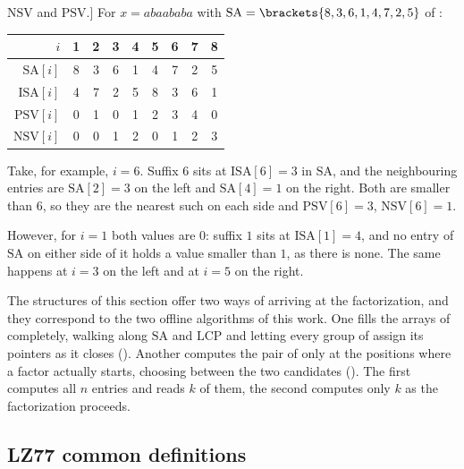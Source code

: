 \begin{example}\(\mathrm{NSV}\) and \(\mathrm{PSV}\).]
\label{ex:nsv-psv}
For \(x = abaababa\) with \(\mathrm{SA} = \brackets{8, 3, 6, 1, 4, 7, 2, 5}\) of :
    \begin{center}
    \begin{tabular}{r|cccccccc}
        \toprule
        \(i\)                  & 1 & 2 & 3 & 4 & 5 & 6 & 7 & 8 \\
        \midrule
        \(\mathrm{SA}[i]\)     & 8 & 3 & 6 & 1 & 4 & 7 & 2 & 5 \\
        \(\mathrm{ISA}[i]\)    & 4 & 7 & 2 & 5 & 8 & 3 & 6 & 1 \\
        \(\mathrm{PSV}[i]\)    & 0 & 1 & 0 & 1 & 2 & 3 & 4 & 0 \\
        \(\mathrm{NSV}[i]\)    & 0 & 0 & 1 & 2 & 0 & 1 & 2 & 3 \\
        \bottomrule
    \end{tabular}
    \end{center}
    Take, for example, \(i = 6\). Suffix \(6\) sits at \(\mathrm{ISA}[6] = 3\) in \(\mathrm{SA}\), and the neighbouring entries are \(\mathrm{SA}[2] = 3\) on the left and \(\mathrm{SA}[4] = 1\) on the right. Both are smaller than \(6\), so they are the nearest such on each side and \(\mathrm{PSV}[6] = 3\), \(\mathrm{NSV}[6] = 1\). 

    However, for \(i = 1\) both values are \(0\): suffix \(1\) sits at \(\mathrm{ISA}[1] = 4\), and no entry of \(\mathrm{SA}\) on either side of it holds a value smaller than \(1\), as there is none. The same happens at \(i = 3\) on the left and at \(i = 5\) on the right.
\end{example}

The structures of this section offer two ways of arriving at the factorization, and they correspond to the two offline algorithms of this work. One fills the arrays of  completely, walking along \(\mathrm{SA}\) and \(\mathrm{LCP}\) and letting every group of  assign its pointers as it closes (\cite{chen2008}). Another computes the pair of  only at the positions where a factor actually starts, choosing between the two candidates (\cite{kkp2012}). The first computes all \(n\) entries and reads \(k\) of them, the second computes only \(k\) as the factorization proceeds.

\subsection{LZ77 common definitions}

